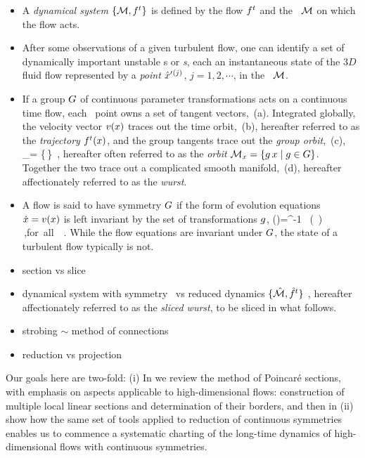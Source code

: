 \begin{itemize}

  \item
A {\em dynamical system} $\{{\cal M},f^t\}$ is defined by the flow $f^t$
and the \statesp\ ${\cal M}$ on which the flow acts.
  \item
After some observations of a given turbulent flow, one can identify a set
of dynamically important unstable {\recurrStr s} or \emph{\template
s}, each an instantaneous state of the
$3D$ fluid flow represented by a \emph{point} ${\hat{x}'}{}^{(j)}$,
$j=1,2,\cdots$, in the \statesp\ ${\cal M}$.
  \item
If a group $G$ of continuous parameter transformations acts on a
continuous time flow, each \statesp\ point owns a set of tangent vectors,
\,(a). Integrated globally, the velocity vector
$v(x)$ traces out the time orbit, \,(b),
hereafter referred to as the {\em trajectory} ${f^{t}(x)}$, and the
group tangents trace out the \emph{group orbit}, \,(c),
\beq
\pS_\ssp = \{\LieEl\,\ssp \mid \LieEl \in {\Group}\}
\,,
hereafter often referred to as the {\em orbit}  ${\cal M}_{x} =
\{g\,x \mid g \in {\ensuremath{G}}\}$. Together the two trace out a
complicated smooth manifold, \,(d), hereafter
affectionately referred to as the {\em wurst}.
  \item
A flow is said to have symmetry $G$ if the form of evolution
equations $\dot{x} = v(x)$ is left invariant by the set of
transformations $g$,
\beq
\vel(\ssp)=\LieEl^{-1} \, \vel(\LieEl \, \ssp)
\,,\qquad \mbox{for all } \LieEl \in {\Group}
\,.
While the flow equations are invariant under $G$, the state of a turbulent flow
typically is not.
  \item section {\PoincS} vs slice \pSRed

  \item
dynamical system  with symmetry \Group\ vs reduced dynamics
$\{\hat{\cal M},\hat{f}^t\}$ , hereafter affectionately referred to as the {\em
sliced wurst}, to be sliced in what follows.
  \item strobing $\sim$ method of connections
  \item reduction vs projection
\end{itemize}

Our goals here are two-fold:
(i) In  we review the method of Poincar\'e sections, with
    emphasis on aspects applicable to high-dimensional flows: construction of
    multiple local linear sections and determination of their borders, and then in
(ii)  show how the same set of tools applied to
    reduction of continuous symmetries enables us to commence a
    systematic charting of the long-time dynamics of high-dimensional
    flows with continuous symmetries.
